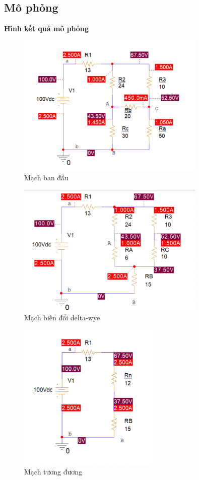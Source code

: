     \subsection{Mô phỏng}
    \textbf{Hình kết quả mô phỏng}
    \begin{figure}[!htbp]
    \centering
    \includegraphics[width=0.8\textwidth]{graphics/ex6/f5.png}
    \caption{Mạch ban đầu}
    \end{figure}
    \begin{figure}[!htbp]
    \centering
    \includegraphics[width=0.8\textwidth]{graphics/ex6/f6.png}
    \caption{Mạch biến đổi delta-wye}
    \end{figure}
    \begin{figure}[!htbp]
        \centering
        \includegraphics[width=0.6\textwidth]{graphics/ex6/f4.png}
        \caption{Mạch tương đương}
        \end{figure}

    
